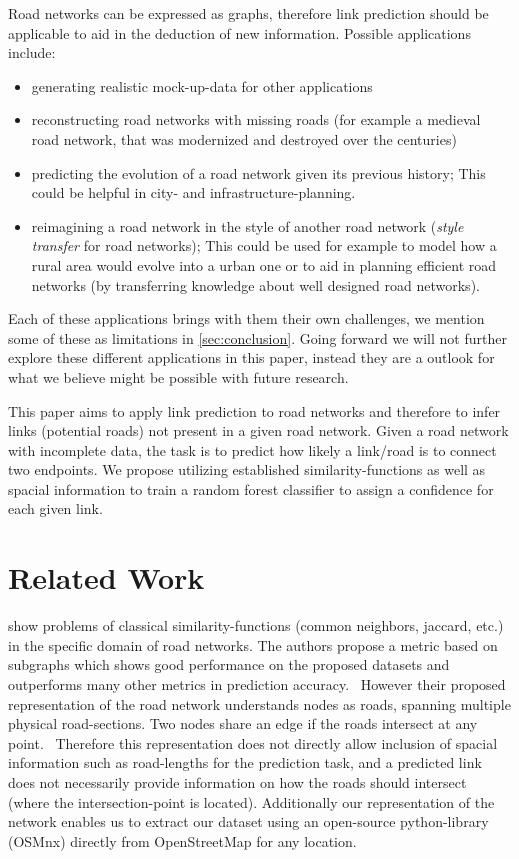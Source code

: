 \documentclass[12pt,a4paper]{IEEEtran}
\begin{document}
Road networks can be expressed as graphs, therefore link prediction should be applicable to aid in the deduction of new information.
Possible applications include:
\begin{itemize}
\item generating realistic mock-up-data for other applications
\item reconstructing road networks with missing roads
      (for example a medieval road network, that was modernized and destroyed over the centuries)
\item predicting the evolution of a road network given its previous history; This could be helpful in city- and infrastructure-planning.
\item reimagining a road network in the style of another road network (\emph{style transfer} for road networks);
      This could be used for example to model how a rural area would evolve into a urban one
      or to aid in planning efficient road networks (by transferring knowledge about well designed road networks).
\end{itemize}
Each of these applications brings with them their own challenges,
we mention some of these as limitations in \autoref{sec:conclusion}.
Going forward we will not further explore these different applications in this paper,
instead they are a outlook for what we believe might be possible with future research.

This paper aims to apply link prediction to road networks and therefore to infer links (potential roads)
not present in a given road network.
Given a road network with incomplete data, the task is to predict how likely a link/road is
to connect two endpoints.
We propose utilizing established similarity-functions
as well as spacial information to train a random forest classifier to assign a
confidence for each given link.

\section{Related Work}\label{sec:related_work}

\citeauthor{road_link_prediction_subgraph} show problems of classical similarity-functions
(common neighbors, jaccard, etc.) in the specific domain of road networks.
The authors propose a metric based on subgraphs which shows good performance on the proposed datasets
and outperforms many other metrics in prediction accuracy.~\cite[see][20]{road_link_prediction_subgraph}
However their proposed representation of the road network understands nodes as roads, spanning multiple physical road-sections.
Two nodes share an edge if the roads intersect at any point.~\cite[see][7]{road_link_prediction_subgraph}
Therefore this representation does not directly allow inclusion of spacial information such as road-lengths for the prediction task,
and a predicted link does not necessarily provide information on how the roads should intersect (where the intersection-point is located).
Additionally our representation of the network enables us to extract our dataset
using an open-source python-library (OSMnx) directly from OpenStreetMap for any location.
\end{document}
